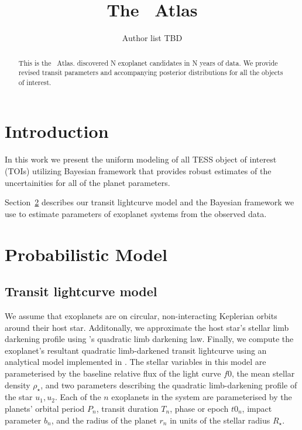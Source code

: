 \documentclass[modern]{aastex63}
\begin{document}
\title{The \tess\ Atlas}



\author{Author list TBD}
% 


\begin{abstract}

This is the \tess\ Atlas.
\tess discovered N exoplanet candidates in N years of data.
We provide revised transit parameters and accompanying posterior distributions for all the \tess objects of interest.

\end{abstract}


\section{Introduction} \label{sec:intro}

In this work we present the uniform modeling of all TESS object of interest (TOIs) utilizing Bayesian framework that provides robust estimates of the uncertainities for all of the planet parameters.

Section~\ref{sec:prob-model} describes our transit lightcurve model and the Bayesian framework we use to estimate parameters of exoplanet systems from the observed data.

\section{Probabilistic Model} \label{sec:prob-model}

\subsection{Transit lightcurve model}
We assume that exoplanets are on circular, non-interacting Keplerian orbits around their host star.
Additonally, we approximate the host star's stellar limb darkening profile using \citet{Kipping:2013}'s quadratic limb darkening law.
Finally, we compute the exoplanet's resultant quadratic limb-darkened transit lightcurve using an analytical model implemented in \starry.
The stellar variables in this model are parameterised by
the baseline relative flux of the light curve $f0$,
the mean stellar density $\rho_\star$,
and two parameters describing the quadratic limb-darkening profile of the
star $u_1, u_2$.
Each of the $n$ exoplanets in the system are parameterised by the planets'
orbital period $P_{n}$,
transit duration $T_{n}$,
phase or epoch $t0_n$,
impact parameter $b_n$,
and the radius of the planet $r_n$ in units of the stellar radius $R_\star$.
\end{document}
